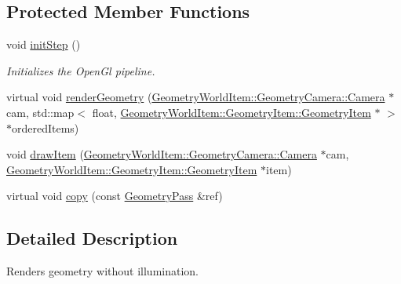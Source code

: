 \subsection*{Protected Member Functions}
\begin{DoxyCompactItemize}
\item 
\mbox{\label{class_geometry_engine_1_1_geometry_render_step_1_1_geometry_pass_a23575018d6032000ac8f2751efcc2240}} 
void \mbox{\hyperlink{class_geometry_engine_1_1_geometry_render_step_1_1_geometry_pass_a23575018d6032000ac8f2751efcc2240}{init\+Step}} ()
\begin{DoxyCompactList}\small\item\em Initializes the Open\+Gl pipeline. \end{DoxyCompactList}\item 
virtual void \mbox{\hyperlink{class_geometry_engine_1_1_geometry_render_step_1_1_geometry_pass_ac84ca025bf90afc42acade7b15b40cf2}{render\+Geometry}} (\mbox{\hyperlink{class_geometry_engine_1_1_geometry_world_item_1_1_geometry_camera_1_1_camera}{Geometry\+World\+Item\+::\+Geometry\+Camera\+::\+Camera}} $\ast$cam, std\+::map$<$ float, \mbox{\hyperlink{class_geometry_engine_1_1_geometry_world_item_1_1_geometry_item_1_1_geometry_item}{Geometry\+World\+Item\+::\+Geometry\+Item\+::\+Geometry\+Item}} $\ast$ $>$ $\ast$ordered\+Items)
\item 
void \mbox{\hyperlink{class_geometry_engine_1_1_geometry_render_step_1_1_geometry_pass_a0e3189d5f441ada51ef31e09f100e270}{draw\+Item}} (\mbox{\hyperlink{class_geometry_engine_1_1_geometry_world_item_1_1_geometry_camera_1_1_camera}{Geometry\+World\+Item\+::\+Geometry\+Camera\+::\+Camera}} $\ast$cam, \mbox{\hyperlink{class_geometry_engine_1_1_geometry_world_item_1_1_geometry_item_1_1_geometry_item}{Geometry\+World\+Item\+::\+Geometry\+Item\+::\+Geometry\+Item}} $\ast$item)
\item 
virtual void \mbox{\hyperlink{class_geometry_engine_1_1_geometry_render_step_1_1_geometry_pass_ae69b08dfd47ccfcc3888ca53511b660d}{copy}} (const \mbox{\hyperlink{class_geometry_engine_1_1_geometry_render_step_1_1_geometry_pass}{Geometry\+Pass}} \&ref)
\end{DoxyCompactItemize}


\subsection{Detailed Description}
Renders geometry without illumination. 

